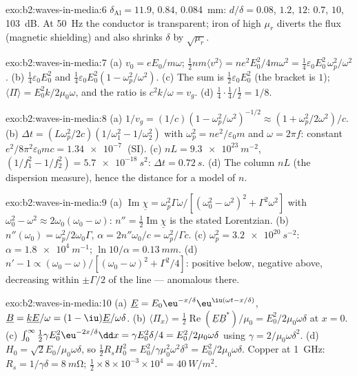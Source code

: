 \begin{solution}{exo:b2:waves-in-media:6}
$\delta_{\text{Al}} = 11.9$, $0.84$, \qty{0.084}{mm}: $d/\delta = 0.08$, $1.2$, $12$: $0.7$,
$10$, \qty{103}{dB}. At \qty{50}{Hz} the conductor is transparent; iron of high
$\mu_r$ diverts the flux (magnetic shielding) and also shrinks $\delta$ by
$\sqrt{\mu_r}$.
\end{solution}

\begin{solution}{exo:b2:waves-in-media:7}
(a) $v_0 = eE_0/m\omega$; $\tfrac12nm\langle v^2\rangle = ne^2E_0^2/4m\omega^2 = \tfrac14\varepsilon_0
E_0^2\,\omega_p^2/\omega^2$. (b) $\tfrac14\varepsilon_0E_0^2$ and $\tfrac14\varepsilon_0E_0^2(1 - \omega_p^2/
\omega^2)$. (c) The sum is $\tfrac12\varepsilon_0E_0^2$ (the bracket is $1$); $\langle\Pi
\rangle = E_0^2k/2\mu_0\omega$, and the ratio is $c^2k/\omega = v_g$. (d) $\tfrac14\cdot\tfrac14
/\tfrac12 = 1/8$.
\end{solution}

\begin{solution}{exo:b2:waves-in-media:8}
(a) $1/v_g = (1/c)(1 - \omega_p^2/\omega^2)^{-1/2} \approx (1 + \omega_p^2/2\omega^2)/c$. (b) $\Delta t
= (L\omega_p^2/2c)(1/\omega_1^2 - 1/\omega_2^2)$ with $\omega_p^2 = ne^2/\varepsilon_0m$ and $\omega =
2\pi f$: constant $e^2/8\pi^2\varepsilon_0mc = \qty{1.34e-7}{}$ (SI). (c) $nL = \qty{9.3e23}{m^{-2}}$,
$(1/f_1^2 - 1/f_2^2) = \qty{5.7e-18}{s^2}$: $\Delta t = \qty{0.72}{s}$. (d) The column $nL$
(the dispersion measure), hence the distance for a model of $n$.
\end{solution}

\begin{solution}{exo:b2:waves-in-media:9}
(a) $\operatorname{Im}\underline\chi = \omega_p^2\Gamma\omega/[(\omega_0^2 - \omega^2)^2 + \Gamma^2\omega^2]$ with
$\omega_0^2 - \omega^2 \approx 2\omega_0(\omega_0 - \omega)$: $n'' = \tfrac12\operatorname{Im}\underline\chi$ is
the stated Lorentzian. (b) $n''(\omega_0) = \omega_p^2/2\omega_0\Gamma$, $\alpha = 2n''\omega_0/c =
\omega_p^2/\Gamma c$. (c) $\omega_p^2 = \qty{3.2e20}{s^{-2}}$: $\alpha = \qty{1.8e4}{m^{-1}}$;
$\ln10/\alpha = \qty{0.13}{mm}$. (d) $n' - 1 \propto (\omega_0 - \omega)/[(\omega_0 - \omega)^2 +
\Gamma^2/4]$: positive below, negative above, decreasing within $\pm\Gamma/2$
of the line --- anomalous there.
\end{solution}

\begin{solution}{exo:b2:waves-in-media:10}
(a) $\underline E = E_0\eu^{-x/\delta}\eu^{\iu(\omega t - x/\delta)}$, $\underline B = \underline k\underline E/\omega
= (1 - \iu)\underline E/\omega\delta$. (b) $\langle\Pi_x\rangle = \tfrac12\operatorname{Re}(\underline E
\underline B^*)/\mu_0 = E_0^2/2\mu_0\omega\delta$ at $x = 0$. (c) $\int_0^\infty\tfrac12\gamma E_0^2
\eu^{-2x/\delta}\dd x = \gamma E_0^2\delta/4 = E_0^2/2\mu_0\omega\delta$ using $\gamma = 2/\mu_0\omega\delta^2$.
(d) $H_0 = \sqrt2E_0/\mu_0\omega\delta$, so $\tfrac12R_sH_0^2 = E_0^2/\gamma\mu_0^2\omega^2\delta^3 =
E_0^2/2\mu_0\omega\delta$. Copper at \qty{1}{GHz}: $R_s = 1/\gamma\delta = \qty{8}{m\ohm}$;
$\tfrac12 \times 8 \times 10^{-3} \times 10^4 = \qty{40}{W/m^2}$.
\end{solution}

